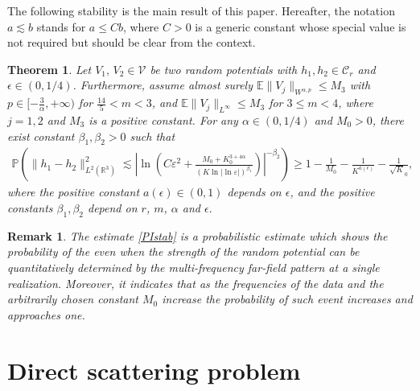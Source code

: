 \documentclass[reqno, 12pt]{amsart}
\newtheorem{Thm}{Theorem}[section]
\newtheorem{Rem}{Remark}[section]
\numberwithin{equation}{section}
\begin{document}
The following stability is the main result of this paper. Hereafter, the notation $a \lesssim b $ stands for $a \le C b$, where $C>0$ is a generic constant whose special value is not required but should be clear from the context.  
\begin{Thm}\label{Thm5.1} Let $V_1,\,V_2 \in \mathcal V$ be two random potentials with $h_1,h_2 \in \mathcal C_r$ and $\epsilon\in (0, 1/4)$. Furthermore, assume almost surely  $\mathbb E\|V_j\|_{W^{\alpha,p}} \le M_3$ with $p \in [ -\frac{3}{\alpha}, +\infty)$ for $\frac{14}{5}<m<3$, and $\mathbb E\|V_j\|_{L^\infty} \le M_3$ for $3 \le m <4$, where $j=1, 2$ and $M_3$ is a positive constant.
	For any $\alpha \in (0,1/4)$ and $M_0>0$, there exist constant $\beta_1,\beta_2>0$ such that
	\begin{align}\label{PIstab}
		\mathbb P \left(\|h_1-h_2\|_{L^2(\mathbb{R}^3)}^2
		\lesssim \left|\ln \left( C\varepsilon^2+\frac{M_0+K_0^{3+4\alpha}}{(K\ln|\ln \varepsilon|)^{\beta_1}} \right) \right|^{-\beta_2}\right)\ge 1-\frac{1}{M_0}-\frac{1}{K^{a(\epsilon)}}-\frac{1}{\sqrt K_0},
	\end{align} 
	where the positive constant $a(\epsilon) \in (0,1)$ depends on $\epsilon $, and the positive constants $\beta_1,\beta_2$ depend on $r$, $m$, $\alpha$ and $\epsilon.$ 
  \end{Thm}
\begin{Rem}
The estimate \eqref{PIstab} is a probabilistic estimate which shows the probability of the even when the strength of the random potential can
be quantitatively determined by the multi-frequency far-field pattern at a single realization. Moreover, it indicates that as the frequencies of the data and the arbitrarily chosen
constant $M_0$ increase 
the probability of such event increases and approaches one.
\end{Rem}





\section{Direct scattering problem}\label{re}
\end{document}
